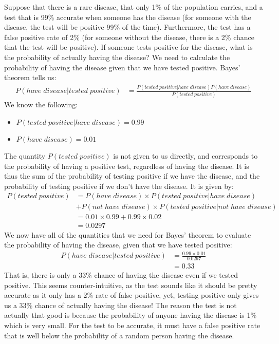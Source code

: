 \begin{example}{Suppose that there is a rare disease, that only 1\% of the population carries, and a test that is 99\% accurate when someone has the disease (for someone with the disease, the test will be positive 99\% of the time). Furthermore, the test has a false positive rate of 2\% (for someone without the disease, there is a 2\% chance that the test will be positive). If someone tests positive for the disease, what is the probability of actually having the disease?}
\label{ex:BayesDisease}
We need to calculate the probability of having the disease given that we have tested positive. Bayes' theorem tells us:
\begin{align*}
P(have\; disease|tested\; positive) &= \frac{P(tested\; positive | have\; disease)P(have\; disease)}{P(tested\; positive)}
\end{align*}
We know the following:
\begin{itemize}
\item $P(tested\; positive | have\; disease)=0.99$
\item $P(have\; disease)=0.01$
\end{itemize}
The quantity $P(tested\; positive)$ is not given to us directly, and corresponds to the probability of having a positive test, regardless of having the disease. It is thus the sum of the probability of testing positive if we have the disease, and the probability of testing positive if we don't have the disease. It is given by:
\begin{align*}
P(tested\; positive) &= P(have\;disease)\times P(tested\; positive | have\; disease)\\
&+ P(not\;have\;disease)\times P(tested\; positive |not\; have\; disease)\\
&=0.01\times 0.99 + 0.99 \times 0.02\\
&=0.0297
\end{align*}
We now have all of the quantities that we need for Bayes' theorem to evaluate the probability of having the disease, given that we have tested positive:
\begin{align*}
P(have\; disease|tested\; positive) &= \frac{0.99\times0.01}{0.0297}\\
&=0.33
\end{align*}
That is, there is only a 33\% chance of having the disease even if we tested positive. This seems counter-intuitive, as the test sounds like it should be pretty accurate as it only has a 2\% rate of false positive, yet, testing positive only gives us a 33\% chance of actually having the disease! The reason the test is not actually that good is because the probability of anyone having the disease is 1\% which is very small. For the test to be accurate, it must have a false positive rate that is well below the probability of a random person having the disease.
\end{example}

